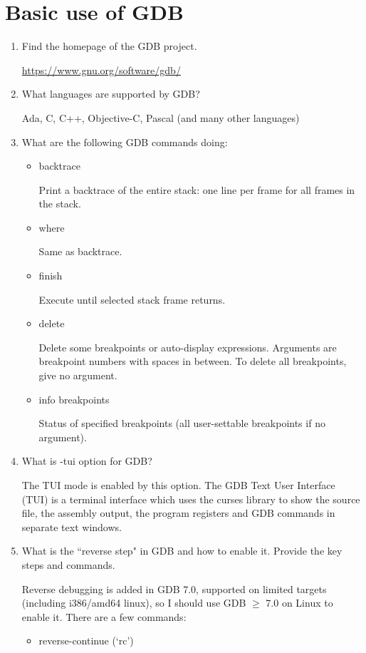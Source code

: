 \documentclass{article}
\begin{document}
\section{Basic use of GDB}
\begin{enumerate}
\item Find the homepage of the GDB project.

\url{https://www.gnu.org/software/gdb/}

\item What languages are supported by GDB?

Ada, C, C++, Objective-C, Pascal (and many other languages)

\item What are the following GDB commands doing:
\begin{itemize}
\item backtrace

Print a backtrace of the entire stack: one line per frame for all frames in the stack.
\item where

Same as backtrace.
\item finish

Execute until selected stack frame returns.
\item delete

Delete some breakpoints or auto-display expressions.
Arguments are breakpoint numbers with spaces in between.
To delete all breakpoints, give no argument.
\item info breakpoints

Status of specified breakpoints (all user-settable breakpoints if no argument).
\end{itemize}

\item What is -tui option for GDB?

The TUI mode is enabled by this option. The GDB Text User Interface (TUI) is a terminal interface which uses the curses library to show the source file, the assembly output, the program registers and GDB commands in separate text windows.

\item What is the ``reverse step" in GDB and how to enable it. Provide the key steps and commands.

Reverse debugging is added in GDB 7.0, supported on limited targets (including i386/amd64 linux), so I should use GDB $\geqslant$ 7.0 on Linux to enable it. There are a few commands:
\begin{itemize}
\item reverse-continue (`rc')


\end{itemize}
\end{enumerate}
\end{document}
